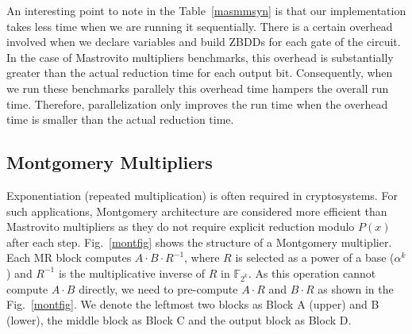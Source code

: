 \par An interesting point to note in the Table~\ref{masmmsyn} is that our implementation takes less time when we are running it sequentially. There is a certain overhead involved when we declare variables and build ZBDDs for each gate of the circuit. In the case of Mastrovito multipliers benchmarks, this overhead is substantially greater than the actual reduction time for each output bit. Consequently, when we run these benchmarks parallely this overhead time hampers the overall run time. Therefore, parallelization only improves the run time when the overhead time is smaller than the actual reduction time. 
\subsection{Montgomery Multipliers}
Exponentiation (repeated multiplication) is often required in cryptosystems.  
For such applications, Montgomery architecture \cite{acar:1998} \cite{wu:2002}
\cite{Knezevic:2008} are considered more efficient than Mastrovito multipliers
as they do not require explicit reduction modulo $P(x)$ after each step.
Fig.~\ref{montfig} shows the structure of a Montgomery
multiplier. Each MR block computes $A\cdot B\cdot R^{-1}$, where $R$
is selected as a power of a base ($\alpha^{k}$) and $R^{-1}$ is the multiplicative 
inverse of $R$ in $\mathbb{F}_{2^k}$. As this operation cannot compute $A\cdot B$
directly, we need to pre-compute $A\cdot R$ and $B\cdot R$ as shown in the Fig.~\ref{montfig}. 
We denote the leftmost
two blocks as Block A (upper) and B (lower), the middle block as Block
C and the output block as Block D.

